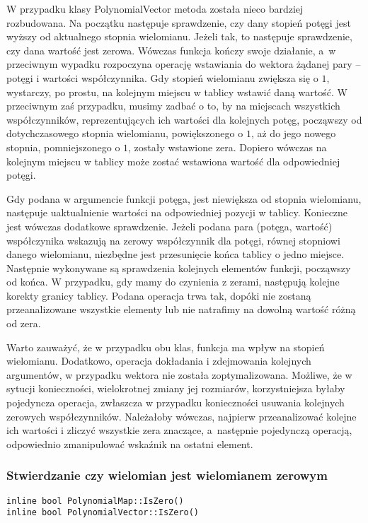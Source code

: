 W przypadku klasy PolynomialVector metoda została nieco bardziej rozbudowana. Na początku następuje sprawdzenie, czy dany stopień potęgi jest wyższy od aktualnego stopnia wielomianu. Jeżeli tak, to następuje sprawdzenie, czy dana wartość jest zerowa. Wówczas funkcja kończy swoje działanie, a~w przeciwnym wypadku rozpoczyna operację wstawiania do wektora żądanej pary – potęgi i wartości współczynnika. Gdy stopień wielomianu zwiększa się o $1$, wystarczy, po prostu, na kolejnym miejscu w tablicy wstawić daną wartość. W przeciwnym zaś przypadku, musimy zadbać o to, by na miejscach wszystkich współczynników, reprezentujących ich wartości dla kolejnych potęg, począwszy od dotychczasowego stopnia wielomianu, powiększonego o $1$, aż do jego nowego stopnia, pomniejszonego o $1$, zostały wstawione zera. Dopiero wówczas na kolejnym miejscu w tablicy może zostać wstawiona wartość dla odpowiedniej potęgi.

Gdy podana w argumencie funkcji potęga, jest niewiększa od stopnia wielomianu, następuje uaktualnienie wartości na odpowiedniej pozycji w tablicy. Konieczne jest wówczas dodatkowe sprawdzenie. Jeżeli podana para (potęga, wartość) współczynika wskazują na zerowy współczynnik dla potęgi, równej stopniowi danego wielomianu, niezbędne jest przesunięcie końca tablicy o jedno miejsce. Następnie wykonywane są sprawdzenia kolejnych elementów funkcji, począwszy od końca. W przypadku, gdy mamy do czynienia z zerami, następują kolejne korekty granicy tablicy. Podana operacja trwa tak, dopóki nie zostaną przeanalizowane wszystkie elementy lub nie natrafimy na dowolną wartość różną od zera.

Warto zauważyć, że w przypadku obu klas, funkcja ma wpływ na stopień wielomianu. Dodatkowo, operacja dokładania i zdejmowania kolejnych argumentów, w przypadku wektora nie została zoptymalizowana. Możliwe, że w sytucji konieczności, wielokrotnej zmiany jej rozmiarów, korzystniejsza byłaby pojedyncza operacja, zwłaszcza w przypadku konieczności usuwania kolejnych zerowych współczynników. Należałoby wówczas, najpierw przeanalizować kolejne ich wartości i zliczyć wszystkie zera znaczące, a~następnie pojedynczą operacją, odpowiednio zmanipulować wskaźnik na ostatni element.

\subsubsection{Stwierdzanie czy wielomian jest wielomianem zerowym}
\begin{lstlisting}
inline bool PolynomialMap::IsZero()
inline bool PolynomialVector::IsZero()
\end{lstlisting}

